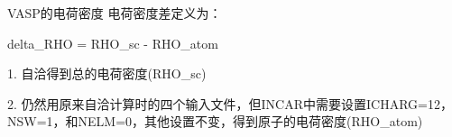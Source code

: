 \textrm{VASP}的电荷密度
电荷密度差定义为：

delta_RHO = RHO_sc - RHO_atom

1. 自洽得到总的电荷密度(RHO_sc)

2. 仍然用原来自洽计算时的四个输入文件，但INCAR中需要设置ICHARG=12，NSW=1，和NELM=0，其他设置不变，得到原子的电荷密度(RHO_atom)
